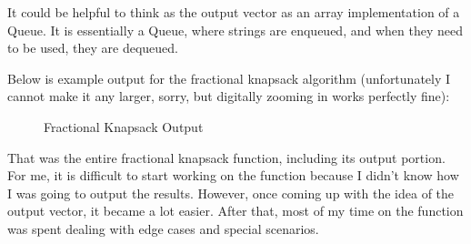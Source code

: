 \documentclass[letterpaper, 10pt]{article}
\begin{document}
\vspace{1em}
\noindent
It could be helpful to think as the output vector as an array implementation of a Queue. It is essentially a Queue, where strings are enqueued, and when they need to be used, they are dequeued.

\vspace{1em}
\noindent
Below is example output for the fractional knapsack algorithm (unfortunately I cannot make it any larger, sorry, but digitally zooming in works perfectly fine):

\begin{figure}[H] 
    \centering 
    \caption{Fractional Knapsack Output}
    \label{fig:figure3.6}
\end{figure}

\vspace{1em}
\noindent
That was the entire fractional knapsack function, including its output portion. For me, it is difficult to start working on the function because I didn't know how I was going to output the results. However, once coming up with the idea of the output vector, it became a lot easier. After that, most of my time on the function was spent dealing with edge cases and special scenarios.
\end{document}
